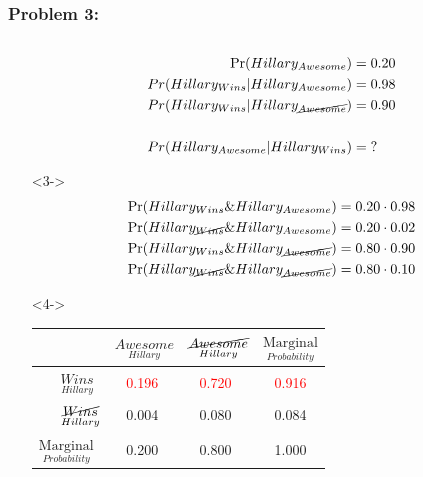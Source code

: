 \documentclass[xcolor={dvipsnames}]{beamer}
\begin{document}
\begin{frame}[fragile]
 \frametitle{Problem 3:}

\begin{columns}
\begin{column}{.55\textwidth}

\vspace{-1.5em}

\begin{itemize}
\item[]
\footnotesize
\begin{align*}
\Pr(Hillary_{Awesome}) = {} & 0.20\\
Pr(Hillary_{Wins} | Hillary_{Awesome}) = {} & 0.98\\
Pr(Hillary_{Wins} | Hillary_{\cancel{Awesome}}) = {} & 0.90\\{}\\
Pr( Hillary_{Awesome} | Hillary_{Wins} ) = {} & ?
\end{align*}

\item[]<3->
\vspace{-1em}
\footnotesize
\begin{align*}
\Pr(Hillary_{Wins} \& Hillary_{Awesome}) = {} & 0.20 \cdot 0.98\\
\Pr(Hillary_{\cancel{Wins}} \& Hillary_{Awesome}) = {} & 0.20 \cdot 0.02\\
\Pr(Hillary_{Wins} \& Hillary_{\cancel{Awesome}}) = {} & 0.80 \cdot 0.90\\
\Pr(Hillary_{\cancel{Wins}} \& Hillary_{\cancel{Awesome}}) = {} & 0.80 \cdot 0.10\\
\end{align*}

\item[]<4->
\vspace{-1em}
\begin{tabular}{m{1.1cm}|m{1.5cm}m{1.5cm}|m{1.5cm}}  %
                           & $\underset{Hillary}{Awesome}$ & $\underset{Hillary}{\cancel{Awesome}}$ & $\underset{Probability}{\text{Marginal}}$\\ \hline
$\quad\;\;\underset{Hillary}{Wins}$ &  $\;\;\;$\textcolor{red}{0.196} & $\;\;\;$\textcolor{red}{0.720} & $\;\;\;$\textcolor{red}{0.916} \\
$\quad\;\;\underset{Hillary}{\cancel{Wins}}$ & $\;\;\;$0.004 & $\;\;\;$0.080 & $\;\;\;$0.084 \\\hline
 $\underset{Probability}{\text{Marginal}}$& $\;\;\;$0.200 & $\;\;\;$0.800 & $\;\;\;$1.000
\end{tabular}


\end{itemize}
\end{column}
\end{columns}
\end{frame}
\end{document}
